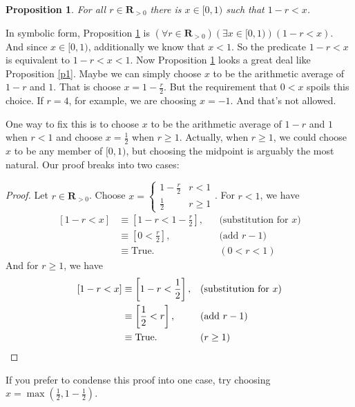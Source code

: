 \documentclass[12pt,fleqn,answers]{article}
\newcommand{\reals}{\mathbf{R}}
\newcommand{\true}{\mathrm{True}}
\newenvironment{myproof}
  {\begin{shaded}\begin{proof}}
  {\end{proof}\end{shaded}}
\newtheorem{prop}{Proposition}
\begin{document}
\begin{prop} 
     For all $r \in \reals_{>0}$ there is $x \in [0,1)$ such that $1-r < x$.  \label{p2}
\end{prop}

\noindent In symbolic form, Proposition \ref{p2} is $\left(\forall r  \in \reals_{>0} \right) \left(\exists x \in [0,1)\right) \left (1-r  < x \right)$.
And since $x \in [0,1)$, additionally we know that $x < 1$.  So the predicate $1-r  < x$ is equivalent to $1-r  < x  < 1$. Now Proposition \ref{p2}
looks a great deal like  Proposition \ref{p1}. Maybe we can simply choose $x$ to be the arithmetic average of $1-r$ and $1$. That is
choose $x = 1 - \frac{r}{2}$.  But the requirement that $0 < x$ spoils this choice. If $r = 4$, for example, we are choosing $x = -1$. And that's 
not allowed.    

One way to fix this is to choose $x$ to be the arithmetic average of $1-r$ and $1$ when $r < 1$ and choose $x = \frac{1}{2}$ when $r \geq 1$. 
Actually, when $r \geq 1$, we could choose $x$ to be any member of $[0,1)$, but choosing the midpoint is arguably the most natural.
Our proof breaks into two cases:
     
      \begin{myproof} Let $r \in \reals_{>0}$. Choose $x = \begin{cases} 1 - \frac{r}{2}  & r < 1 \\ \frac{1}{2} & r \geq 1 \end{cases}$. For $r < 1$, we have
      \begin{align*}
       \left[1-r < x \right] &\equiv \left[1-r < 1 - \frac{r}{2}  \right], && \text{(substitution for $x$)} \\
                                  &\equiv  \left[0 <  \frac{r}{2}  \right], && \text{(add $r-1$)} \\
                                  &\equiv \true.   &&(0 < r < 1)
      \end{align*}
      And for $r \geq 1$, we have
       \begin{align*}
       \left[1-r < x \right] &\equiv \left[1-r < \frac{1}{2}  \right], && \text{(substitution for $x$)} \\
                                  &\equiv  \left[\frac{1}{2}  <  r  \right], && \text{(add $r-1$)} \\
                                  &\equiv \true.   &&(r \geq 1) \qedhere
      \end{align*}
      \end{myproof}
 \noindent If you prefer to condense this proof into one case, try choosing $x = \max(\frac{1}{2}, 1-\frac{1}{2})$.
\end{document}
